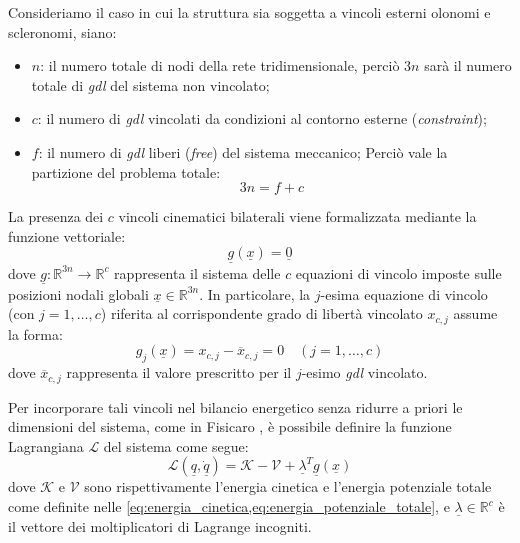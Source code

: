 Consideriamo il caso in cui la struttura sia soggetta a vincoli esterni olonomi e scleronomi, siano:
\begin{itemize}
   \item $n$: il numero totale di nodi della rete tridimensionale, perciò $3n$ sarà il numero totale di \textit{gdl} del sistema non vincolato;
   \item $c$: il numero di \textit{gdl} vincolati da condizioni al contorno esterne (\textit{constraint});
   \item $f$: il numero di \textit{gdl} liberi (\textit{free}) del sistema meccanico;
   Perciò vale la partizione del problema totale:
   \begin{equation}
      3n = f + c
   \end{equation}
\end{itemize}

La presenza dei $c$ vincoli cinematici bilaterali viene formalizzata mediante la funzione vettoriale:
\begin{equation}
   \underline{g}(\underline{x}) = \underline{0}
   \label{eq:vincoli_generali}
\end{equation}
dove $\underline{g}: \mathbb{R}^{3n} \to \mathbb{R}^c$ rappresenta il sistema delle $c$ equazioni di vincolo imposte sulle posizioni nodali globali $\underline{x} \in \mathbb{R}^{3n}$. 
In particolare, la $j$-esima equazione di vincolo (con $j = 1, \dots, c$) riferita al corrispondente grado di libertà vincolato $x_{c,j}$ assume la forma:
\begin{equation}
g_j(\underline{x}) = x_{c,j} - \overline{x}_{c,j} = 0 \quad (j = 1, \dots, c)
\end{equation}
dove $\overline{x}_{c,j}$ rappresenta il valore prescritto per il $j$-esimo \textit{gdl} vincolato.

Per incorporare tali vincoli nel bilancio energetico senza ridurre a priori le dimensioni del sistema, come in Fisicaro \cite{Fisicaro}, è possibile definire la funzione Lagrangiana $\mathcal{L}$ del sistema come segue:
\begin{equation}
   \mathcal{L} \left(\underline{q}, \dot{\underline{q}}\right) = \mathcal{K} - \mathcal{V} + \underline{\lambda}^T \underline{g}(\underline{x})
   \label{eq:funzione_lagrangiana_vincolata}
\end{equation}
dove $\mathcal{K}$ e $\mathcal{V}$ sono rispettivamente l'energia cinetica e l'energia potenziale totale come definite nelle \cref{eq:energia_cinetica,eq:energia_potenziale_totale}, e $\underline{\lambda} \in \mathbb{R}^c$ è il vettore dei moltiplicatori di Lagrange incogniti.

